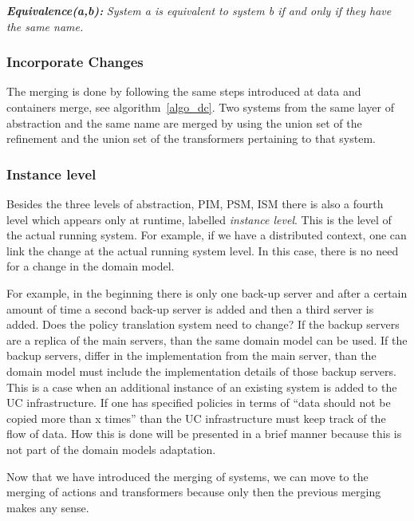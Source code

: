 \documentclass{sig-alternate}
\begin{document}
\textbf{\textit{Equivalence(a,b):}} \textit{System a is equivalent to system b if and only if they have the same name.}

\subsubsection{Incorporate Changes}

The merging is done by following the same steps introduced at data and containers merge, see algorithm~\ref{algo_dc}.
Two systems from the same layer of abstraction and the same name are merged by 
using the union set of the refinement and the union set of the transformers pertaining to that system.

\subsubsection{Instance level}
Besides the three levels of abstraction, PIM, PSM, ISM there is also a fourth level which appears only at runtime, labelled \textit{instance level}.
This is the level of the actual running system.
For example, if we have a distributed context, one can link the change at the actual running system level. 
In this case, there is no need for a change in the domain model. 

For example, in the beginning there is only one back-up server and after a certain amount of time a second back-up server is added and then a third server is added. 
Does the policy translation system need to change? 
If the backup servers are a replica of the main servers, than the same domain model can be used.
If the backup servers, differ in the implementation from the main server, than the domain model must include the implementation details of those backup servers.
This is a case when an additional instance of an existing system is added to the UC infrastructure.
If one has specified policies in terms of ``data should not be copied more than x times'' than the UC infrastructure must keep track of the flow of data.
How this is done will be presented in a brief manner because this is not part of the domain models adaptation.

Now that we have introduced the merging of systems, we can move to the merging of actions and transformers because only then the previous merging makes any sense.

\end{document}
